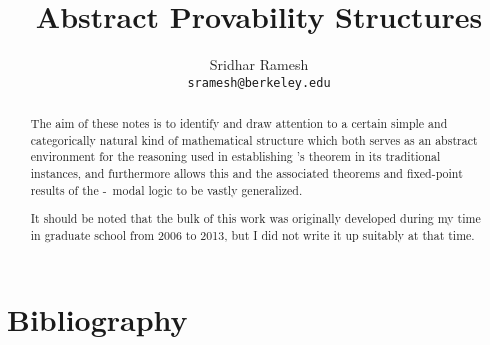 \documentclass[12pt]{article}
\title{Abstract Provability Structures}
\author{
  Sridhar Ramesh\\
  \texttt{sramesh@berkeley.edu}
}
\begin{document}
\maketitle

\begin{abstract}
The aim of these notes is to identify and draw attention to a certain simple and categorically natural kind of mathematical structure which both serves as an abstract environment for the reasoning used in establishing \Loeb's theorem in its traditional instances, and furthermore allows this and the associated theorems and fixed-point results of the \Goedel-\Loeb\ modal logic to be vastly generalized.

It should be noted that the bulk of this work was originally developed during my time in graduate school from 2006 to 2013, but I did not write it up suitably at that time.
\end{abstract}

\newpage
{}
\setcounter{page}{1}
\tableofcontents












\newpage \section{Bibliography}
\printbibliography

\printindex
\end{document}

